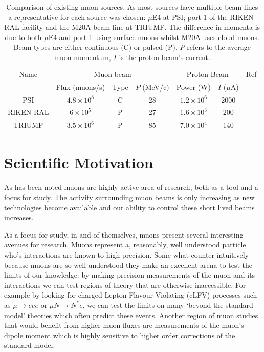 \begin{table}[htpb]
  \begin{center}
  \begin{tabular}{c | c | c | c | c | c | c}
    Name       &  \multicolumn{3}{c|}{Muon beam}                 &  \multicolumn{2}{c|}{Proton Beam}  &   Ref \\
               &  Flux (muons/s)     &  Type  & \( P \) (MeV/c)  &  Power (W)    & \(I\) (\(\mu\)A)   &       \\
    \hline    
    PSI        &  \(4.8\times10^8\)  &  C  &  28  &  \(1.2\times10^6\)  &  2000  &  \cite{muE4 PSI beam}   \\ 
    RIKEN-RAL  &  \(6\times10^5\)    &  P  &  27  &  \(1.6\times10^3\)  &  200   &  \cite{RIKEN_RAL}       \\
    TRIUMF     &  \(3.5\times10^6\)  &  P  &  85  &  \(7.0\times10^4\)  &  140   &  \cite{TRIUMF mu beams} \\
  \end{tabular}
  \end{center}
  \caption{Comparison of existing muon sources. As most sources have multiple beam-lines a representative for each source was chosen: \(\mu\)E4 at PSI; port-1 of the RIKEN-RAL facility and the M20A beam-line at TRIUMF. The difference in momenta is due to both \(\mu\)E4 and port-1 using surface muons whilst M20A uses cloud muons. Beam types are either continuous (C) or pulsed (P). \( P \) refers to the average muon momentum, \( I \) is the proton beam's current.}
  \label{tab:cf_muon_sources}
\end{table}


\section{Scientific Motivation} %
\label{sec:scientific_motivation}
As has been noted muons are highly active area of research, both as a tool and a focus for study. The activity surrounding muon beams is only increasing as new technologies become available and our ability to control these short lived beams increases. 

As a focus for study, in and of themselves, muons present several interesting avenues for research. Muons represent a, reasonably, well understood particle who's interactions are known to high precision. Some what counter-intuitively because muons are so well understood they make an excellent arena to test the limits of our knowledge: by making precision measurements of the muon and its interactions we can test regions of theory that are otherwise inaccessible. For example by looking for charged Lepton Flavour Violating (cLFV) processes such as \( \mu\rightarrow eee \) or \( \mu N \rightarrow N^* e \), we can test the limits on many `beyond the standard model' theories which often predict these events. Another region of muon studies that would benefit from higher muon fluxes are measurements of the muon's dipole moment which is highly sensitive to higher order corrections of the standard model.

